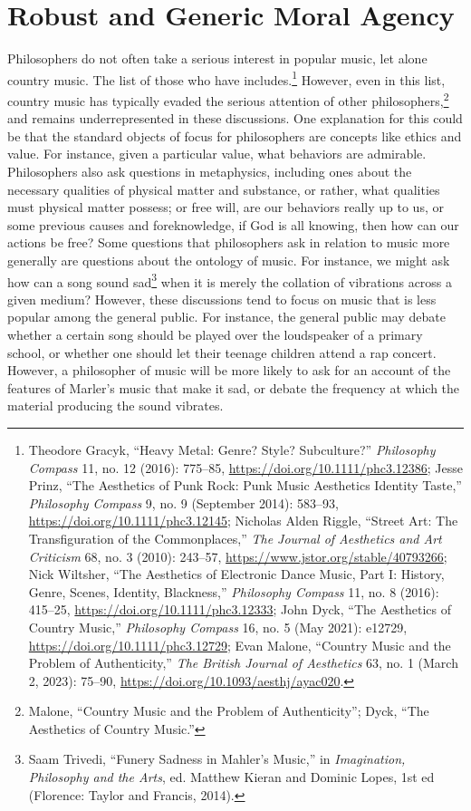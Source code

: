 \documentclass[
  12pt,
]{book}
\theoremstyle{definition}
\theoremstyle{definition}
\theoremstyle{definition}
\theoremstyle{definition}
\theoremstyle{remark}
\begin{document}
\chapter{Robust and Generic Moral Agency}\label{robust-and-generic-moral-agency}

Philosophers do not often take a serious interest in popular music, let alone country music. The list of those who have includes.\footnote{Theodore Gracyk, {``Heavy Metal: Genre? {Style}? {Subculture}?''} \emph{Philosophy Compass} 11, no. 12 (2016): 775--85, \url{https://doi.org/10.1111/phc3.12386}; Jesse Prinz, {``The {Aesthetics} of {Punk Rock}: {Punk Music Aesthetics Identity Taste},''} \emph{Philosophy Compass} 9, no. 9 (September 2014): 583--93, \url{https://doi.org/10.1111/phc3.12145}; Nicholas Alden Riggle, {``Street {Art}: {The Transfiguration} of the {Commonplaces},''} \emph{The Journal of Aesthetics and Art Criticism} 68, no. 3 (2010): 243--57, \url{https://www.jstor.org/stable/40793266}; Nick Wiltsher, {``The {Aesthetics} of {Electronic Dance Music}, {Part I}: {History}, {Genre}, {Scenes}, {Identity}, {Blackness},''} \emph{Philosophy Compass} 11, no. 8 (2016): 415--25, \url{https://doi.org/10.1111/phc3.12333}; John Dyck, {``The Aesthetics of Country Music,''} \emph{Philosophy Compass} 16, no. 5 (May 2021): e12729, \url{https://doi.org/10.1111/phc3.12729}; Evan Malone, {``Country {Music} and the {Problem} of {Authenticity},''} \emph{The British Journal of Aesthetics} 63, no. 1 (March 2, 2023): 75--90, \url{https://doi.org/10.1093/aesthj/ayac020}.} However, even in this list, country music has typically evaded the serious attention of other philosophers,\footnote{Malone, {``Country {Music} and the {Problem} of {Authenticity}''}; Dyck, {``The Aesthetics of Country Music.''}} and remains underrepresented in these discussions. One explanation for this could be that the standard objects of focus for philosophers are concepts like ethics and value. For instance, given a particular value, what behaviors are admirable. Philosophers also ask questions in metaphysics, including ones about the necessary qualities of physical matter and substance, or rather, what qualities must physical matter possess; or free will, are our behaviors really up to us, or some previous causes and foreknowledge, if God is all knowing, then how can our actions be free? Some questions that philosophers ask in relation to music more generally are questions about the ontology of music. For instance, we might ask how can a song sound sad\footnote{Saam Trivedi, {``Funery {Sadness} in {Mahler}'s {Music},''} in \emph{Imagination, {Philosophy} and the {Arts}}, ed. Matthew Kieran and Dominic Lopes, 1st ed (Florence: {Taylor and Francis}, 2014).} when it is merely the collation of vibrations across a given medium? However, these discussions tend to focus on music that is less popular among the general public. For instance, the general public may debate whether a certain song should be played over the loudspeaker of a primary school, or whether one should let their teenage children attend a rap concert. However, a philosopher of music will be more likely to ask for an account of the features of Marler's music that make it sad, or debate the frequency at which the material producing the sound vibrates. 
\end{document}
